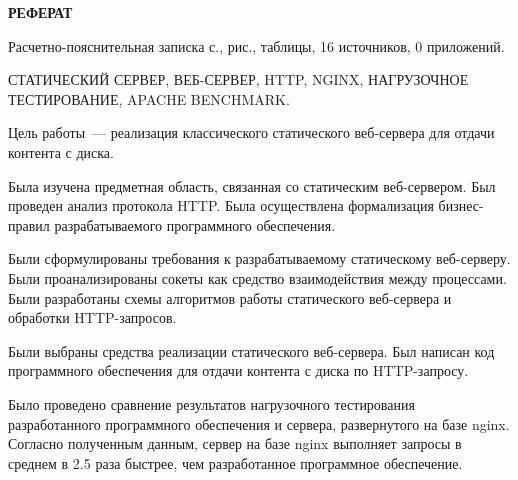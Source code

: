 \begin{center}
	\LARGE\bfseries{РЕФЕРАТ}
\end{center}

Расчетно-пояснительная записка \pageref{LastPage} с., \totalfigures{} рис., \totaltables{} таблицы, 16 источников, 0 приложений.

СТАТИЧЕСКИЙ СЕРВЕР, ВЕБ-СЕРВЕР, HTTP, NGINX, НАГРУЗОЧНОЕ ТЕСТИРОВАНИЕ, APACHE BENCHMARK.

Цель работы~--- реализация классического статического веб-сервера для отдачи контента с диска.

Была изучена предметная область, связанная со статическим веб-сервером.
Был проведен анализ протокола HTTP.
Была осуществлена формализация бизнес-правил разрабатываемого программного обеспечения.

Были сформулированы требования к разрабатываемому статическому веб-серверу.
Были проанализированы сокеты как средство взаимодействия между процессами.
Были разработаны схемы алгоритмов работы статического веб-сервера и обработки HTTP-запросов.

Были выбраны средства реализации статического веб-сервера.
Был написан код программного обеспечения для отдачи контента с диска по HTTP-запросу.

Было проведено сравнение результатов нагрузочного тестирования разработанного программного обеспечения и сервера, развернутого на базе nginx. Согласно полученным данным, сервер на базе nginx выполняет запросы в среднем в 2.5 раза быстрее, чем разработанное программное обеспечение.
